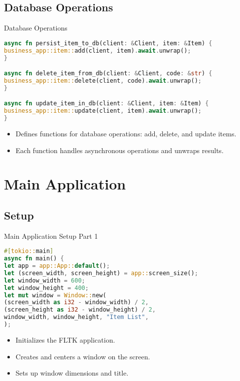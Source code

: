 \documentclass[aspectratio=169, table]{beamer}
\begin{document}
\subsection{Database Operations}
\begin{frame}[fragile]{Database Operations}
\begin{lstlisting}[language=Rust]
async fn persist_item_to_db(client: &Client, item: &Item) {
business_app::item::add(client, item).await.unwrap();
}

async fn delete_item_from_db(client: &Client, code: &str) {
business_app::item::delete(client, code).await.unwrap();
}

async fn update_item_in_db(client: &Client, item: &Item) {
business_app::item::update(client, item).await.unwrap();
}
\end{lstlisting}

\begin{itemize}
\item Defines functions for database operations: add, delete, and update items.
\item Each function handles asynchronous operations and unwraps results.
\end{itemize}
\end{frame}

\section{Main Application}
\subsection{Setup}
\begin{frame}[fragile]{Main Application Setup Part 1}
\vspace{15pt}
\begin{lstlisting}[language=Rust]
#[tokio::main]
async fn main() {
let app = app::App::default();
let (screen_width, screen_height) = app::screen_size();
let window_width = 600;
let window_height = 400;
let mut window = Window::new(
(screen_width as i32 - window_width) / 2,
(screen_height as i32 - window_height) / 2,
window_width, window_height, "Item List",
);
\end{lstlisting}

\begin{itemize}
\item Initializes the FLTK application.
\item Creates and centers a window on the screen.
\item Sets up window dimensions and title.
\end{itemize}
\end{frame}
\end{document}
